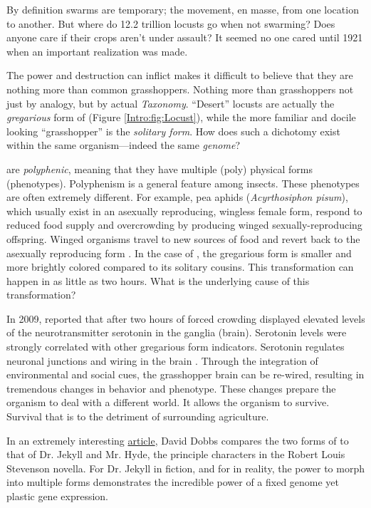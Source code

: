   By definition swarms are temporary; the movement, en masse, from one location to another. But where do 12.2 trillion locusts go when not swarming? Does anyone care if their crops aren't under assault? It seemed no one cared until 1921 when an important realization was made.

  The power and destruction \locusts{} can inflict makes it difficult to believe that they are nothing more than common grasshoppers. Nothing more than grasshoppers not just by analogy, but by actual \textit{Taxonomy}. ``Desert'' locusts are actually the \textit{gregarious} form  of \locusts{} (Figure \ref{Intro:fig:Locust}), while the more familiar and docile looking ``grasshopper'' is the \textit{solitary form}. How does such a dichotomy exist within the same organism---indeed the same \textit{genome}?

  \locusts{} are \textit{polyphenic}, meaning that they have multiple (poly) physical forms (phenotypes). Polyphenism is a general feature among insects. These phenotypes are often extremely different. For example, pea aphids (\textit{Acyrthosiphon pisum}), which usually exist in an asexually reproducing, wingless female form, respond to reduced food supply and overcrowding by producing winged sexually-reproducing offspring. Winged organisms travel to new sources of food and revert back to the asexually reproducing form \citep{Shingleton2003,Purandare2014b}. In the case of \locusts{}, the gregarious form is smaller and more brightly colored compared to its solitary cousins. This transformation can happen in as little as two hours. What is the underlying cause of this transformation?

  In 2009, \citet{Anstey2009} reported that after two hours of forced crowding \locusts{} displayed elevated levels of the neurotransmitter serotonin in the ganglia (brain). Serotonin levels were strongly correlated with other gregarious form indicators. Serotonin regulates neuronal junctions and wiring in the brain \citep{Hoeffer2003}. Through the integration of environmental and social cues, the grasshopper brain can be re-wired, resulting in tremendous changes in behavior and phenotype. These changes prepare the organism to deal with a different world. It allows the organism to survive. Survival that is to the detriment of surrounding agriculture.

  In an extremely interesting \href{http://aeon.co/magazine/nature-and-cosmos/why-its-time-to-lay-the-selfish-gene-to-rest/}{article}, David Dobbs compares the two forms of \locusts{} to that of Dr. Jekyll and Mr. Hyde, the principle characters in the Robert Louis Stevenson novella. For Dr. Jekyll in fiction, and for \locusts{} in reality, the power to morph into multiple forms demonstrates the incredible power of a fixed genome yet plastic gene expression.

